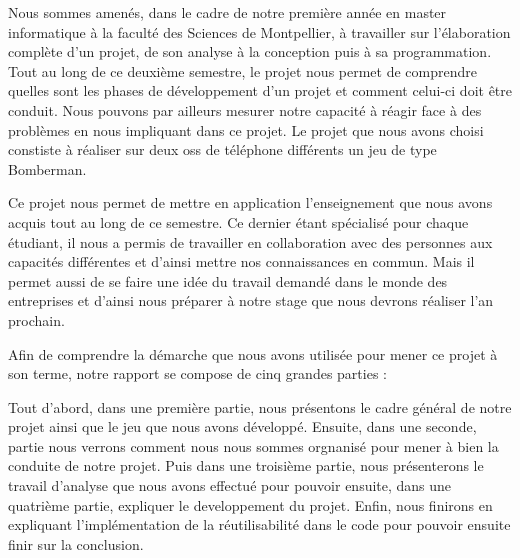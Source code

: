 Nous sommes amenés, dans le cadre de notre première année en master informatique à la faculté des Sciences de Montpellier, à travailler sur l’élaboration complète d’un projet, de son analyse à la conception puis à sa programmation. Tout au long de ce deuxième semestre, le projet nous permet de comprendre quelles sont les phases de développement d’un projet et comment celui-ci doit être conduit. Nous pouvons par ailleurs mesurer notre capacité à réagir face à des problèmes en nous impliquant dans ce projet. Le projet que nous avons choisi constiste à réaliser sur deux \glspl{os} de téléphone différents un jeu de type Bomberman.

Ce projet nous permet de mettre en application l'enseignement que nous avons acquis tout au long de ce semestre. Ce dernier étant spécialisé pour chaque étudiant, il nous a permis de travailler en collaboration avec des personnes aux capacités différentes et d'ainsi mettre nos connaissances en commun. Mais il permet aussi de se faire une idée du travail demandé dans le monde des entreprises et d'ainsi nous préparer à notre stage que nous devrons réaliser l'an prochain.

Afin de comprendre la démarche que nous avons utilisée pour mener ce projet à son terme, notre rapport se compose de cinq grandes parties : 

Tout d'abord, dans une première partie, nous présentons le cadre général de notre projet ainsi que le jeu que nous avons développé. Ensuite, dans une seconde, partie nous verrons comment nous nous sommes orgnanisé pour mener à bien la conduite de notre projet. Puis dans une troisième partie, nous présenterons le travail d'analyse que nous avons effectué pour pouvoir ensuite, dans une quatrième partie, expliquer le developpement du projet. Enfin, nous finirons en expliquant l'implémentation de la réutilisabilité dans le code pour pouvoir ensuite finir sur la conclusion.